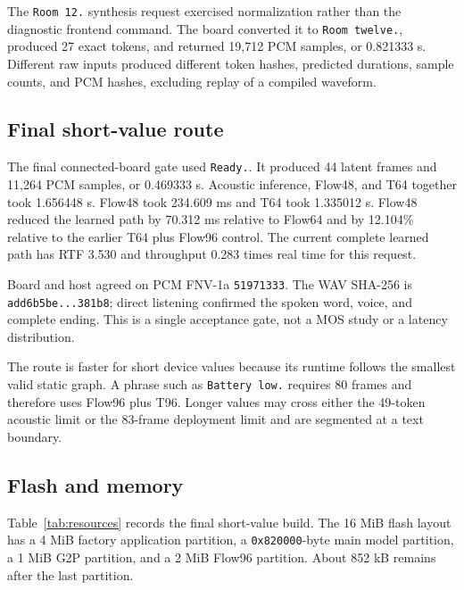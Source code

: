 \documentclass[10pt]{article}
\begin{document}
The \texttt{Room 12.} synthesis request exercised normalization rather than
the diagnostic frontend command. The board converted it to
\texttt{Room twelve.}, produced 27 exact tokens, and returned 19,712 PCM
samples, or 0.821333 s. Different raw inputs produced different token hashes,
predicted durations, sample counts, and PCM hashes, excluding replay of a
compiled waveform.

\subsection{Final short-value route}

The final connected-board gate used \texttt{Ready.}. It produced 44 latent
frames and 11,264 PCM samples, or 0.469333 s. Acoustic inference, Flow48, and
T64 together took 1.656448 s. Flow48 took 234.609 ms and T64 took 1.335012 s.
Flow48 reduced the learned path by 70.312 ms relative to Flow64 and by 12.104\%
relative to the earlier T64 plus Flow96 control. The current complete learned
path has RTF 3.530 and throughput 0.283 times real time for this request.

Board and host agreed on PCM FNV-1a \texttt{51971333}. The WAV SHA-256 is
\texttt{add6b5be...381b8}; direct listening confirmed the spoken word, voice,
and complete ending. This is a single acceptance gate, not a MOS study or a
latency distribution.

The route is faster for short device values because its runtime follows the
smallest valid static graph. A phrase such as \texttt{Battery low.} requires
80 frames and therefore uses Flow96 plus T96. Longer values may cross either
the 49-token acoustic limit or the 83-frame deployment limit and are segmented
at a text boundary.

\subsection{Flash and memory}

Table~\ref{tab:resources} records the final short-value build. The 16 MiB flash
layout has a 4 MiB factory application partition, a \texttt{0x820000}-byte
main model partition, a 1 MiB G2P partition, and a 2 MiB Flow96 partition.
About 852 kB remains after the last partition.
\end{document}
